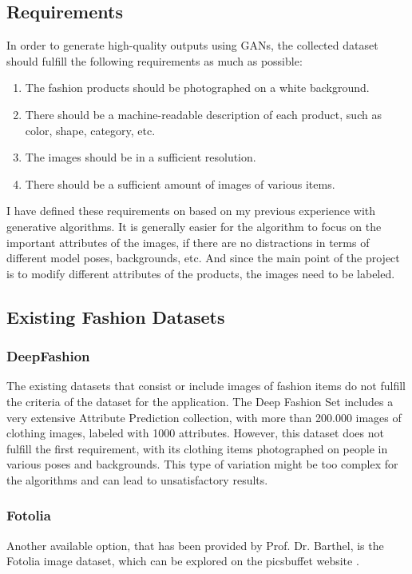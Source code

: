 \documentclass{article}
\begin{document}
\subsection {Requirements}
In order to generate high-quality outputs using GANs, the collected dataset should fulfill the following requirements as much as possible:
\begin{enumerate}
\item The fashion products should be photographed on a white background. 
\item There should be a machine-readable description of each product, such as color, shape, category, etc. 
\item The images should be in a sufficient resolution.
\item There should be a sufficient amount of images of various items.

\end{enumerate}
I have defined these requirements on based on my previous experience with generative algorithms. It is generally easier for the algorithm to focus on the important attributes of the images, if there are no distractions in terms of different model poses, backgrounds, etc. And since the main point of the project is to modify different attributes of the products, the images need to be labeled.

\subsection {Existing Fashion Datasets}

\subsubsection{DeepFashion}
The existing datasets that consist or include images of fashion items do not fulfill the criteria of the dataset for the application. The Deep Fashion Set \cite{the_chinese_university_of_hong_kong_deepfashion_nodate} includes a very extensive Attribute Prediction collection, with more than 200.000 images of clothing images, labeled with 1000 attributes. However, this dataset does not fulfill the first requirement, with its clothing items photographed on people in various poses and backgrounds. This type of variation might be too complex for the algorithms and can lead to unsatisfactory results.

\subsubsection{Fotolia}
Another available option, that has been provided by Prof. Dr. Barthel, is the Fotolia image dataset, which can be explored on the picsbuffet website \cite{noauthor_picsbuffet_nodate}.
\end{document}
